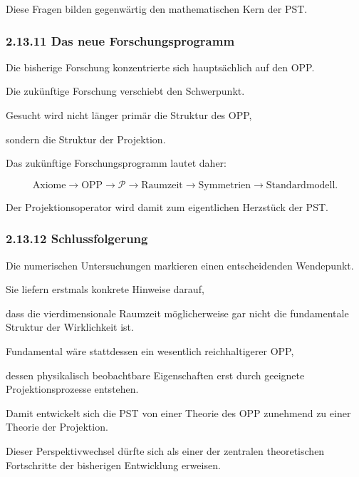 Diese Fragen bilden gegenwärtig den mathematischen Kern der PST.


\subsubsection*{2.13.11 Das neue Forschungsprogramm}

Die bisherige Forschung konzentrierte sich hauptsächlich auf den OPP.

Die zukünftige Forschung verschiebt den Schwerpunkt.

Gesucht wird nicht länger primär die Struktur des OPP,

sondern die Struktur der Projektion.

Das zukünftige Forschungsprogramm lautet daher:

\[
\boxed{
\text{Axiome}
\rightarrow
\text{OPP}
\rightarrow
\boxed{\mathcal P}
\rightarrow
\text{Raumzeit}
\rightarrow
\text{Symmetrien}
\rightarrow
\text{Standardmodell}.
}
\]

Der Projektionsoperator wird damit zum eigentlichen Herzstück der PST.


\subsubsection*{2.13.12 Schlussfolgerung}

Die numerischen Untersuchungen markieren einen entscheidenden Wendepunkt.

Sie liefern erstmals konkrete Hinweise darauf,

dass die vierdimensionale Raumzeit möglicherweise gar nicht die fundamentale
Struktur der Wirklichkeit ist.

Fundamental wäre stattdessen ein wesentlich reichhaltigerer OPP,

dessen physikalisch beobachtbare Eigenschaften erst durch geeignete
Projektionsprozesse entstehen.

Damit entwickelt sich die PST von einer Theorie des OPP zunehmend zu einer
Theorie der Projektion.

Dieser Perspektivwechsel dürfte sich als einer der zentralen theoretischen
Fortschritte der bisherigen Entwicklung erweisen.

